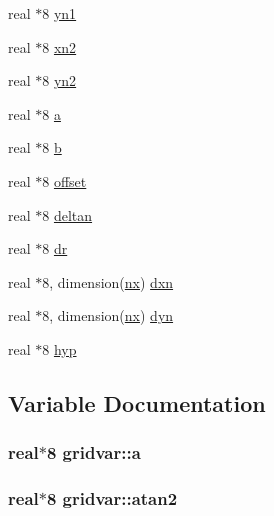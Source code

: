 \begin{DoxyCompactItemize}
\item 
real $\ast$8 \hyperlink{namespacegridvar_aae5cbf9885ae6ff5abebd0b9768a574d}{yn1}
\item 
real $\ast$8 \hyperlink{namespacegridvar_a62f11262a634086d3483618aff305ad6}{xn2}
\item 
real $\ast$8 \hyperlink{namespacegridvar_adfe4b86cb9e6418fe49ea8441e612530}{yn2}
\item 
real $\ast$8 \hyperlink{namespacegridvar_a44d97aa52c240db97de12d4e36c6b5c5}{a}
\item 
real $\ast$8 \hyperlink{namespacegridvar_a88f13d276e07180f43279156c26a1c41}{b}
\item 
real $\ast$8 \hyperlink{namespacegridvar_a7fe3c8c80f1312a7f4236d8673422436}{offset}
\item 
real $\ast$8 \hyperlink{namespacegridvar_aa3ec4b56c55b261b07d99a0087d8e431}{deltan}
\item 
real $\ast$8 \hyperlink{namespacegridvar_aca6bbeece732654bf9a01b443eabf0ad}{dr}
\item 
real $\ast$8, dimension(\hyperlink{namespacegridvar_ac50c143a371abc586b838320ddc88fdc}{nx}) \hyperlink{namespacegridvar_a1ce05db2c1a334cd361b4c8f96df509d}{dxn}
\item 
real $\ast$8, dimension(\hyperlink{namespacegridvar_ac50c143a371abc586b838320ddc88fdc}{nx}) \hyperlink{namespacegridvar_ad38d62b5127d5c104db8eb449c05a2f2}{dyn}
\item 
real $\ast$8 \hyperlink{namespacegridvar_a549d685a2b1afd1a9cd81342258cead5}{hyp}
\end{DoxyCompactItemize}


\subsection{Variable Documentation}
\hypertarget{namespacegridvar_a44d97aa52c240db97de12d4e36c6b5c5}{}
\subsubsection[{a}]{\setlength{\rightskip}{0pt plus 5cm}real$\ast$8 gridvar\+::a}\label{namespacegridvar_a44d97aa52c240db97de12d4e36c6b5c5}
\hypertarget{namespacegridvar_aaf7ab9a465673cc6de7235ca2790a0d8}{}
\subsubsection[{atan2}]{\setlength{\rightskip}{0pt plus 5cm}real$\ast$8 gridvar\+::atan2}\label{namespacegridvar_aaf7ab9a465673cc6de7235ca2790a0d8}
\hypertarget{namespacegridvar_a88f13d276e07180f43279156c26a1c41}{}
